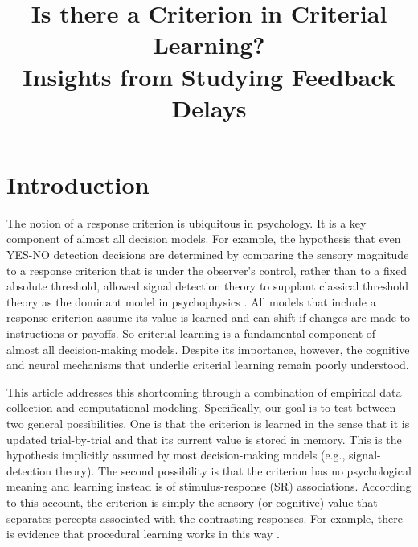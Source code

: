 \documentclass[doc, floatsintext]{apa7}
\title{Is there a Criterion in Criterial Learning? \\ \vspace{.08in}
Insights from Studying Feedback Delays
}
\begin{document}
\maketitle 

\section{Introduction}
The notion of a response criterion is ubiquitous in
psychology. It is a key component of almost all decision
models. For example, the hypothesis that even YES-NO
detection decisions are determined by comparing the sensory
magnitude to a response criterion that is under the
observer's control, rather than to a fixed absolute
threshold, allowed signal detection theory to supplant
classical threshold theory as the dominant model in
psychophysics \parencite{GreenSwets1966}. All models that
include a response criterion assume its value is learned and
can shift if changes are made to instructions or payoffs. So
criterial learning is a fundamental component of almost all
decision-making models. Despite its importance, however, the
cognitive and neural mechanisms that underlie criterial
learning remain poorly understood.

This article addresses this shortcoming through a
combination of empirical data collection and computational
modeling. Specifically, our goal is to test between two
general possibilities. One is that the criterion is learned
in the sense that it is updated trial-by-trial and that its
current value is stored in memory. This is the hypothesis
implicitly assumed by most decision-making models (e.g.,
signal-detection theory). The second possibility is that the
criterion has no psychological meaning and learning instead
is of stimulus-response (SR) associations. According to this
account, the criterion is simply the sensory (or cognitive)
value that separates percepts associated with the
contrasting responses. For example, there is evidence that
procedural learning works in this way
\parencite{AshbyWaldron1999}.
\end{document}
